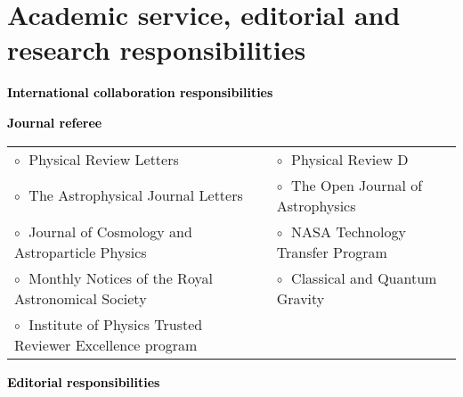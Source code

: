 \vspace{-0.1cm}

\vspace{0.2cm}

\section{Academic service, editorial and research responsibilities}

\textbf{\textcolor{black}{International collaboration responsibilities}}
\vspace{0.1cm}



\textbf{\textcolor{black}{Journal referee}}
\vspace{0.1cm}

\begin{tabular}{@{\hskip 0.4cm}l@{\hskip 0.4in}l}
$\circ\;$ Physical Review Letters & $\circ\;$ Physical Review D \\
$\circ\;$  The Astrophysical Journal Letters  &  $\circ\;$  The Open Journal of Astrophysics  \\
$\circ\;$  Journal of Cosmology and Astroparticle Physics & $\circ\;$ NASA Technology Transfer Program \\
$\circ\;$  Monthly Notices of the Royal Astronomical Society& $\circ\;$ Classical and Quantum Gravity\\
$\circ\;$ Institute of Physics Trusted Reviewer Excellence program \\
\end{tabular}

\vspace{0.2cm}
\textbf{\textcolor{black}{Editorial responsibilities}}
\vspace{0.1cm}


\vspace{-0.1cm}

